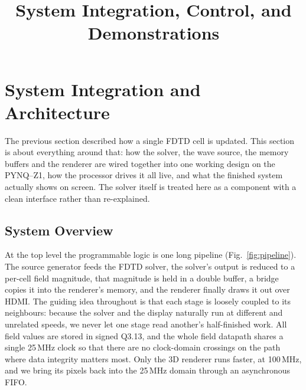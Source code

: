 \documentclass[11pt]{article}
\title{System Integration, Control, and Demonstrations}
\author{}
\date{}
\begin{document}
\maketitle
\vspace{-3em}

\section{System Integration and Architecture}

The previous section described how a single FDTD cell is updated. This section
is about everything around that: how the solver, the wave source, the memory
buffers and the renderer are wired together into one working design on the
PYNQ--Z1, how the processor drives it all live, and what the finished system
actually shows on screen. The solver itself is treated here as a component with
a clean interface rather than re-explained.

\subsection{System Overview}

At the top level the programmable logic is one long pipeline
(Fig.~\ref{fig:pipeline}). The source generator feeds the FDTD solver, the
solver's output is reduced to a per-cell field magnitude, that magnitude is
held in a double buffer, a bridge copies it into the renderer's memory, and the
renderer finally draws it out over HDMI. The guiding idea throughout is that
each stage is loosely coupled to its neighbours: because the solver and the
display naturally run at different and unrelated speeds, we never let one stage
read another's half-finished work. All field values are stored in signed Q3.13,
and the whole field datapath shares a single 25\,MHz clock so that there are no
clock-domain crossings on the path where data integrity matters most. Only the
3D renderer runs faster, at 100\,MHz, and we bring its pixels back into the
25\,MHz domain through an asynchronous FIFO.
\end{document}
